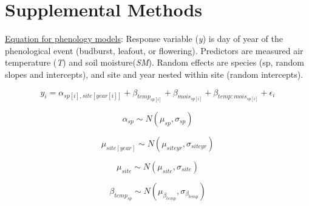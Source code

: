 \documentclass{article}
\begin{document}
\begin{singlespace}

\end{singlespace}


\clearpage

\section* {Supplemental Methods}
\underline{Equation for phenology models}: 
Response variable (\textit{y}) is day of year of the phenological event (budburst, leafout, or flowering). Predictors are measured air temperature (\textit{T}) and soil moisture(\textit{SM}). Random effects are species (sp, random slopes and intercepts), and site and year nested within site (random intercepts). %

\begin{equation}
y_{i}=\alpha_{sp[i],site[year[i]]} + \beta_{temp_{sp[i]}}+ \beta_{mois_{sp[i]}} + \beta_{temp:mois_{sp[i]}}+\epsilon_{i}\label{eq:8}
\end{equation}

\begin{equation}
\alpha_{sp}\sim N(\mu_{sp}, \sigma_{sp})
\end{equation}

\begin{equation}
\mu_{site[year]} \sim N(\mu_{siteyr}, \sigma_{siteyr})
\end{equation}

\begin{equation}
\mu_{site} \sim N(\mu_{site}, \sigma_{site})
\end{equation}

\begin{equation}
\beta_{temp_{sp}} \sim N(\mu_{\beta_{temp}}, \sigma_{\beta_{temp}})
\end{equation}
\end{document}
